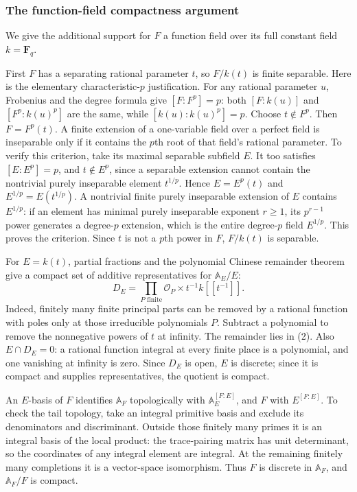 \documentclass[11pt,a4paper]{article}
\begin{document}
\subsubsection{The function-field compactness
argument}\label{the-function-field-compactness-argument}

We give the additional support for \(F\) a function field over its full
constant field \(k=\mathbf F_q\).

First \(F\) has a separating rational parameter \(t\), so \(F/k(t)\) is
finite separable. Here is the elementary characteristic-\(p\)
justification. For any rational parameter \(u\), Frobenius and the
degree formula give \([F:F^p]=p\): both \([F:k(u)]\) and
\([F^p:k(u)^p]\) are the same, while \([k(u):k(u)^p]=p\). Choose
\(t\notin F^p\). Then \(F=F^p(t)\). A finite extension of a one-variable
field over a perfect field is inseparable only if it contains the
\(p\)th root of that field's rational parameter. To verify this
criterion, take its maximal separable subfield \(E\). It too satisfies
\([E:E^p]=p\), and \(t\notin E^p\), since a separable extension cannot
contain the nontrivial purely inseparable element \(t^{1/p}\). Hence
\(E=E^p(t)\) and \(E^{1/p}=E(t^{1/p})\). A nontrivial finite purely
inseparable extension of \(E\) contains \(E^{1/p}\): if an element has
minimal purely inseparable exponent \(r\geq1\), its \(p^{r-1}\) power
generates a degree-\(p\) extension, which is the entire degree-\(p\)
field \(E^{1/p}\). This proves the criterion. Since \(t\) is not a
\(p\)th power in \(F\), \(F/k(t)\) is separable.

For \(E=k(t)\), partial fractions and the polynomial Chinese remainder
theorem give a compact set of additive representatives for
\(\mathbb A_E/E\): \[
D_E=\prod_{P\text{ finite}}\mathcal O_P
       \times t^{-1}k[[t^{-1}]].
\tag{2}
\] Indeed, finitely many finite principal parts can be removed by a
rational function with poles only at those irreducible polynomials
\(P\). Subtract a polynomial to remove the nonnegative powers of \(t\)
at infinity. The remainder lies in (2). Also \(E\cap D_E=0\): a rational
function integral at every finite place is a polynomial, and one
vanishing at infinity is zero. Since \(D_E\) is open, \(E\) is discrete;
since it is compact and supplies representatives, the quotient is
compact.

An \(E\)-basis of \(F\) identifies \(\mathbb A_F\) topologically with
\(\mathbb A_E^{[F:E]}\), and \(F\) with \(E^{[F:E]}\). To check the tail
topology, take an integral primitive basis and exclude its denominators
and discriminant. Outside those finitely many primes it is an integral
basis of the local product: the trace-pairing matrix has unit
determinant, so the coordinates of any integral element are integral. At
the remaining finitely many completions it is a vector-space
isomorphism. Thus \(F\) is discrete in \(\mathbb A_F\), and
\(\mathbb A_F/F\) is compact.
\end{document}
